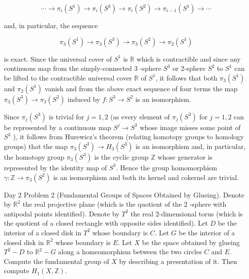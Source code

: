 \documentclass[10pt]{article}
\begin{document}
$$
\cdots \rightarrow \pi_{i}\left(S^{1}\right) \rightarrow \pi_{i}\left(S^{3}\right) \rightarrow \pi_{i}\left(S^{2}\right) \rightarrow \pi_{i-1}\left(S^{1}\right) \rightarrow \cdots
$$

and, in particular, the sequence

$$
\pi_{3}\left(S^{1}\right) \rightarrow \pi_{3}\left(S^{3}\right) \rightarrow \pi_{3}\left(S^{2}\right) \rightarrow \pi_{2}\left(S^{1}\right)
$$

is exact. Since the universal cover of $S^{1}$ is $\mathbb{R}$ which is contractible and since any continuous map from the simply-connected 3 -sphere $S^{3}$ or 2-sphere $S^{2}$ to $S^{1}$ can be lifted to the contractible universal cover $\mathbb{R}$ of $S^{1}$, it follows that both $\pi_{3}\left(S^{1}\right)$ and $\pi_{2}\left(S^{1}\right)$ vanish and from the above exact sequence of four terms the map $\pi_{3}\left(S^{3}\right) \rightarrow \pi_{3}\left(S^{2}\right)$ induced by $f: S^{3} \rightarrow S^{2}$ is an isomorphism.

Since $\pi_{j}\left(S^{3}\right)$ is trivial for $j=1,2$ (as every element of $\pi_{j}\left(S^{3}\right)$ for $j=1,2$ can be represented by a continuous map $S^{j} \rightarrow S^{3}$ whose image misses some point of $S^{3}$ ), it follows from Hurewicz's theorem (relating homotopy groups to homology groups) that the map $\pi_{3}\left(S^{3}\right) \rightarrow H_{3}\left(S^{3}\right)$ is an isomorphism and, in particular, the homotopy group $\pi_{3}\left(S^{3}\right)$ is the cyclic group $\mathbb{Z}$ whose generator is represented by the identity map of $S^{3}$. Hence the group homomorphism $\gamma: \mathbb{Z} \rightarrow \pi_{3}\left(S^{2}\right)$ is an isomorphism and both its kernel and cokernel are trivial.

Day 2 Problem 2 (Fundamental Groups of Spaces Obtained by Glueing). Denote by $\mathbb{R}^{2}$ the real projective plane (which is the quotient of the 2 -sphere with antipodal points identified). Denote by $T^{2}$ the real 2-dimensional torus (which is the quotient of a closed rectangle with opposite sides identified). Let $D$ be the interior of a closed disk in $T^{2}$ whose boundary is $C$. Let $G$ be the interior of a closed disk in $\mathbb{R}^{2}$ whose boundary is $E$. Let $X$ be the space obtained by glueing $T^{2}-D$ to $\mathbb{R}^{2}-G$ along a homeomorphism between the two circles $C$ and $E$. Compute the fundamental group of $X$ by describing a presentation of it. Then compute $H_{1}(X, \mathbb{Z})$.
\end{document}
